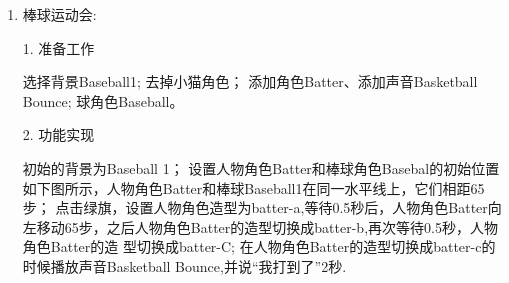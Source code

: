 \documentclass[10pt, a4paper]{article}
\begin{document}
\begin{enumerate}
        \item 棒球运动会:

        1. 准备工作
        \begin{tasks}[label = (\arabic*)]
            \task 选择背景Baseball1;
            \task 去掉小猫角色；
            \task 添加角色Batter、添加声音Basketball Bounce;
            \task 球角色Baseball。
        \end{tasks}
        2. 功能实现
        \begin{tasks}[label = (\arabic*)]
            \task 初始的背景为Baseball 1；
            \task 设置人物角色Batter和棒球角色Basebal的初始位置如下图所示，人物角色Batter和棒球Baseball1在同一水平线上，它们相距65步；
            \task 点击绿旗，设置人物角色造型为batter-a,等待0.5秒后，人物角色Batter向左移动65步，之后人物角色Batter的造型切换成batter-b,再次等待0.5秒，人物角色Batter的造
            型切换成batter-C;
            \task 在人物角色Batter的造型切换成batter-c的时候播放声音Basketball Bounce,并说“我打到了”2秒.
        \end{tasks}
    \end{enumerate}
\end{document}
